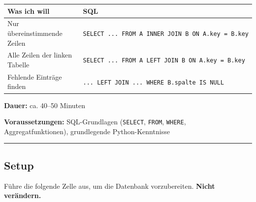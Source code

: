 \documentclass[
  nswissgerman,
  a4paper,
  DIV=11,
  numbers=noendperiod,
  ngerman]{scrreprt}
\newcounter{none} %
\begin{document}
{\def\LTcaptype{none} %
\begin{longtable}[]{@{}
  >{\raggedright\arraybackslash}p{}
  >{\raggedright\arraybackslash}p{}@{}}
\toprule\noalign{}
\begin{minipage}[b]{\linewidth}\raggedright
Was ich will
\end{minipage} & \begin{minipage}[b]{\linewidth}\raggedright
SQL
\end{minipage} \\
\midrule\noalign{}
\endhead
\bottomrule\noalign{}
\endlastfoot
Nur übereinstimmende Zeilen &
\texttt{SELECT\ ...\ FROM\ A\ INNER\ JOIN\ B\ ON\ A.key\ =\ B.key} \\
Alle Zeilen der linken Tabelle &
\texttt{SELECT\ ...\ FROM\ A\ LEFT\ JOIN\ B\ ON\ A.key\ =\ B.key} \\
Fehlende Einträge finden &
\texttt{...\ LEFT\ JOIN\ ...\ WHERE\ B.spalte\ IS\ NULL} \\
\end{longtable}
}

\textbf{Dauer:} ca. 40--50 Minuten

\textbf{Voraussetzungen:} SQL-Grundlagen (\texttt{SELECT},
\texttt{FROM}, \texttt{WHERE}, Aggregatfunktionen), grundlegende
Python-Kenntnisse

\begin{center}\rule{0.5\linewidth}{0.5pt}\end{center}

\subsection{Setup}\label{setup}

Führe die folgende Zelle aus, um die Datenbank vorzubereiten.
\textbf{Nicht verändern.}
\end{document}
